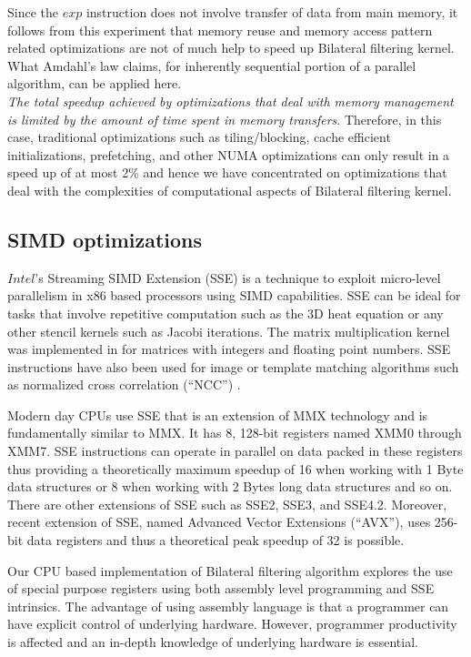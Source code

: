 \documentclass{IEEEtran}
\begin{document}
Since the $exp$ instruction does not involve transfer of data from main memory, it follows from this experiment that memory reuse and memory access pattern related optimizations are not of much help to speed up Bilateral filtering kernel. What Amdahl's law claims, for inherently sequential portion of a parallel algorithm, can be applied here. \\ \textit{The total speedup achieved by optimizations that deal with memory management is limited by the amount of time spent in memory transfers}. Therefore, in this case, traditional optimizations such as tiling/blocking, cache efficient initializations, prefetching, and other NUMA optimizations can only result in a speed up of at most 2\% and hence we have concentrated on optimizations that deal with the complexities of computational aspects of Bilateral filtering kernel.

\subsection{SIMD optimizations}
\label{sub:SIMD1} 
$Intel$'s Streaming SIMD Extension (SSE) is a technique to exploit micro-level parallelism in x86 based processors using SIMD capabilities. SSE can be ideal for tasks that involve repetitive computation such as the 3D heat equation or any other stencil kernels such as Jacobi iterations\cite{kdatta2008}. The matrix multiplication kernel was implemented in \cite{matrix-multi,MatrixMultiFloating} for matrices with integers and floating point numbers. SSE instructions have also been used for image or template matching algorithms such as normalized cross correlation (``NCC'') \cite{NCCmatching}.

Modern day CPUs use SSE that is an extension of MMX technology and is fundamentally similar to MMX. It has 8, 128-bit registers named XMM0 through XMM7. SSE instructions can operate in parallel on data packed in these registers thus providing a theoretically maximum speedup of 16 when working with 1 Byte data structures or 8 when working with 2 Bytes long data structures and so on. There are other extensions of SSE such as SSE2, SSE3, and SSE4.2. Moreover, recent extension of SSE, named Advanced Vector Extensions (``AVX''), uses 256-bit data registers and thus a theoretical peak speedup of 32 is possible.

Our CPU based implementation of Bilateral filtering algorithm explores the use of special purpose registers using both assembly level programming and SSE intrinsics. The advantage of using assembly language is that a programmer can have explicit control of underlying hardware. However, programmer productivity is affected and an in-depth knowledge of underlying hardware is essential. 
\end{document}
